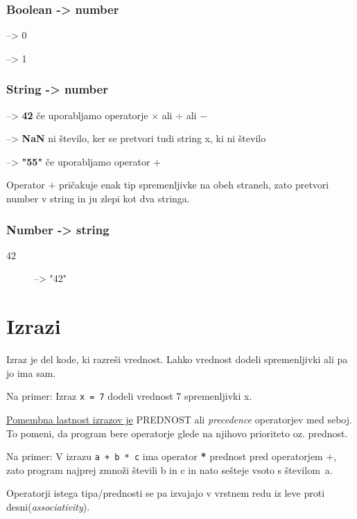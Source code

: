 \subsubsection*{Boolean -> number}
\begin{description}[align=left]
	\item[\texttt{FALSE}] --> 0
	\item[\texttt{TRUE}]  --> 1
\end{description}
\subsubsection*{String -> number}
\begin{description}[align=left]
	\item["42"] --> \textbf{42} če uporabljamo operatorje $\times$ ali $\div$ ali $-$	
	\item["5x"] --> \textbf{NaN} ni število, ker se pretvori tudi string x, ki ni število
	\item["5"+5] --> \textbf{"55"} če uporabljamo operator $+$
\end{description}
Operator $+$ pričakuje enak tip spremenljivke na obeh straneh, zato pretvori number v string in ju zlepi kot dva stringa.
\subsubsection*{Number -> string}
\begin{description}
	\item[42] --> "42"
\end{description}



\section{Izrazi}
Izraz je del kode, ki razreši vrednost. Lahko vrednost dodeli spremenljivki ali pa jo ima sam.\

Na primer: Izraz \texttt{x = 7} dodeli vrednost 7 spremenljivki x.\

\underline{Pomembna lastnost izrazov je} PREDNOST ali \textit{precedence} operatorjev med seboj. To pomeni, da program bere operatorje glede na njihovo prioriteto  oz. prednost.\

Na primer: V izrazu \texttt{a + b * c} ima operator \textbf{*} prednost pred operatorjem $+$, zato program najprej zmnoži števili b in c in nato sešteje vsoto s številom~a.\

Operatorji istega tipa/prednosti se pa izvajajo v vrstnem redu iz leve proti desni(\textit{associativity}).
\pagebreak
